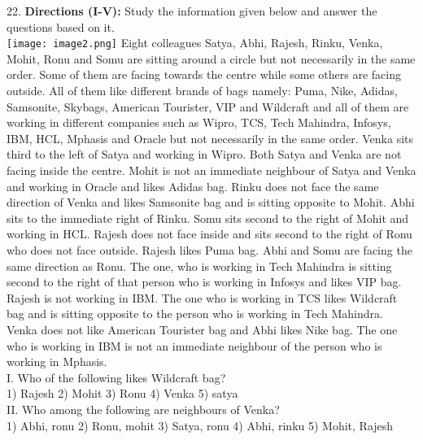 \documentclass[
]{article}
\begin{document}
22. \textbf{Directions (I-V):} Study the information given below and answer the questions based on it.\\
\texttt{[image: image2.png]}
Eight colleagues Satya, Abhi, Rajesh, Rinku, Venka, Mohit, Ronu and Somu are sitting
around a circle but not necessarily in the same order. Some of them are facing towards the
centre while some others are facing outside. All of them like different brands of bags
namely: Puma, Nike, Adidas, Samsonite, Skybags, American Tourister, VIP and Wildcraft
and all of them are working in different companies such as Wipro, TCS, Tech Mahindra,
Infosys, IBM, HCL, Mphasis and Oracle but not necessarily in the same order.
Venka sits third to the left of Satya and working in Wipro. Both Satya and Venka are not
facing inside the centre. Mohit is not an immediate neighbour of Satya and Venka and
working in Oracle and likes Adidas bag. Rinku does not face the same direction of Venka
and likes Samsonite bag and is sitting opposite to Mohit. Abhi sits to the immediate right of
Rinku. Somu sits second to the right of Mohit and working in HCL. Rajesh does not face
inside and sits second to the right of Ronu who does not face outside. Rajesh likes Puma
bag. Abhi and Somu are facing the same direction as Ronu. The one, who is working in Tech
Mahindra is sitting second to the right of that person who is working in Infosys and likes
VIP bag. Rajesh is not working in IBM. The one who is working in TCS likes Wildcraft bag
and is sitting opposite to the person who is working in Tech Mahindra. Venka does not like
American Tourister bag and Abhi likes Nike bag. The one who is working in IBM is not an
immediate neighbour of the person who is working in Mphasis.\\

I. Who of the following likes Wildcraft bag?\\
1) Rajesh \hspace{2mm}2) Mohit \hspace{2mm}3) Ronu \hspace{2mm}4) Venka \hspace{2mm}5) satya\\

II. Who among the following are neighbours of Venka?\\
1) Abhi, ronu \hspace{2mm}2) Ronu, mohit \hspace{2mm}3) Satya, ronu
4) Abhi, rinku \hspace{2mm}5) Mohit, Rajesh\\
\end{document}
